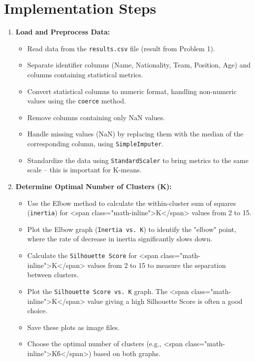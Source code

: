 \documentclass[12pt]{report}
\begin{document}
{{{\section{Implementation Steps} %
\begin{enumerate}
	\item \textbf{Load and Preprocess Data:} %
\begin{itemize}
  \item Read data from the \texttt{results.csv} file (result from Problem 1).
  \item Separate identifier columns (Name, Nationality, Team, Position, Age) and columns containing statistical metrics.
  \item Convert statistical columns to numeric format, handling non-numeric values using the \texttt{coerce} method.
  \item Remove columns containing only NaN values.
  \item Handle missing values (NaN) by replacing them with the median of the corresponding column, using \texttt{SimpleImputer}.
  \item Standardize the data using \texttt{StandardScaler} to bring metrics to the same scale -- this is important for K-means.
\end{itemize}

	\item \textbf{Determine Optimal Number of Clusters (K):} %
\begin{itemize}
  \item Use the Elbow method to calculate the within-cluster sum of squares (\texttt{inertia}) for <span class="math-inline">K</span> values from 2 to 15.
  \item Plot the Elbow graph (\texttt{Inertia vs. K}) to identify the "elbow" point, where the rate of decrease in inertia significantly slows down.
\item Calculate the \texttt{Silhouette Score} for <span class="math-inline">K</span> values from 2 to 15 to measure the separation between clusters.
  \item Plot the \texttt{Silhouette Score vs. K} graph. The <span class="math-inline">K</span> value giving a high Silhouette Score is often a good choice.
  \item Save these plots as image files.
  \item Choose the optimal number of clusters (e.g., <span class="math-inline">K\=6</span>) based on both graphs.
\end{itemize}


\end{enumerate}}}}
\end{document}

